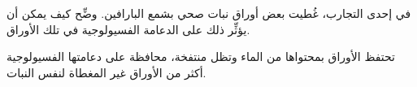 
\begin{question}

\begin{instance}

\begin{frq}

\begin{stem}
في إحدى التجارب، غُطيت بعض أوراق نبات صحي بشمع البارافين. وضِّح كيف يمكن أن يؤثِّر ذلك على الدعامة الفسيولوجية في تلك الأوراق.\par

\end{stem}

\begin{answer}
تحتفظ الأوراق بمحتواها من الماء وتظل منتفخة، محافظة على دعامتها الفسيولوجية أكثر من الأوراق غير المغطاة لنفس النبات.\par

\end{answer}

\end{frq}

\end{instance}

\end{question}
